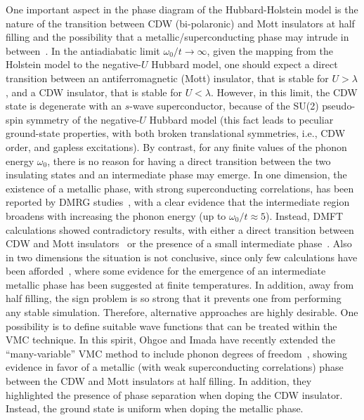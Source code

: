 \documentclass[aps,superscriptaddress,amsmath,amssymb,twocolumn,showpacs,floatfix,english]{revtex4}
\begin{document}
One important aspect in the phase diagram of the Hubbard-Holstein model is the nature of the transition between CDW (bi-polaronic) and 
Mott insulators at half filling and the possibility that a metallic/superconducting phase may intrude in between~\cite{Takada1996,Takada2003}. 
In the antiadiabatic limit $\omega_0/t \to \infty$, given the mapping from the Holstein model to the negative-$U$ Hubbard model, one should 
expect a direct transition between an antiferromagnetic (Mott) insulator, that is stable for $U>\lambda$, and a CDW insulator, that is stable 
for $U<\lambda$. However, in this limit, the CDW state is degenerate with an $s$-wave superconductor, because of the SU(2) pseudo-spin 
symmetry of the negative-$U$ Hubbard model (this fact leads to peculiar ground-state properties, with both broken translational symmetries, 
i.e., CDW order, and gapless excitations). By contrast, for any finite values of the phonon energy $\omega_0$, there is no reason for 
having a direct transition between the two insulating states and an intermediate phase may emerge. In one dimension, the existence of a 
metallic phase, with strong superconducting correlations, has been reported by DMRG studies~\cite{Clay2005,Tezuka2007,Fehske2008}, with a 
clear evidence that the intermediate region broadens with increasing the phonon energy (up to $\omega_0/t \approx 5$). Instead, DMFT 
calculations showed contradictory results, with either a direct transition between CDW and Mott insulators~\cite{Bauer2010} or the presence 
of a small intermediate phase~\cite{Murakami2013}. Also in two dimensions the situation is not conclusive, since only few calculations have 
been afforded~\cite{Nowadnick2012,Johnston2013}, where some evidence for the emergence of an intermediate metallic phase has been suggested 
at finite temperatures. In addition, away from half filling, the sign problem is so strong that it prevents one from performing any stable 
simulation. Therefore, alternative approaches are highly desirable. One possibility is to define suitable wave functions that can be treated 
within the VMC technique. In this spirit, Ohgoe and Imada have recently extended the ``many-variable'' VMC method to include phonon degrees 
of freedom~\cite{Ohgoe2017,Ohgoe2014}, showing evidence in favor of a metallic (with weak superconducting correlations) phase between the 
CDW and Mott insulators at half filling. In addition, they highlighted the presence of phase separation when doping the CDW insulator. 
Instead, the ground state is uniform when doping the metallic phase.
\end{document}
